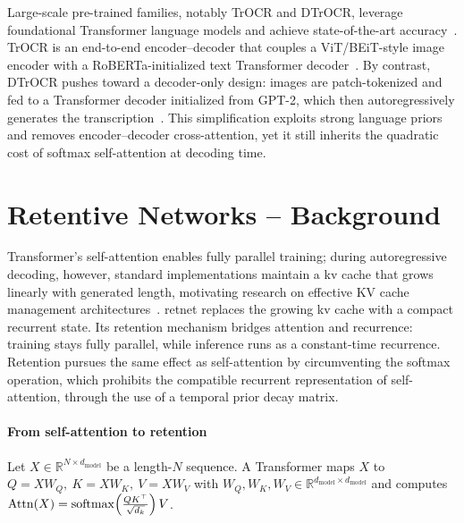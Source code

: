 \documentclass[times, review, 10pt]{elsarticle}
\begin{document}
Large-scale pre-trained families, notably TrOCR and DTrOCR, leverage foundational Transformer language models and achieve state-of-the-art accuracy~\cite{TrOCR,DTrOCR}. TrOCR is an end-to-end encoder–decoder that couples a ViT/BEiT-style image encoder with a RoBERTa-initialized text Transformer decoder~\cite{TrOCR}. By contrast, DTrOCR pushes toward a decoder-only design: images are patch-tokenized and fed to a Transformer decoder initialized from GPT-2, which then autoregressively generates the transcription~\cite{DTrOCR,gpt2}. This simplification exploits strong language priors and removes encoder–decoder cross-attention, yet it still inherits the quadratic cost of softmax self-attention at decoding time.

\section{Retentive Networks -- Background}
\label{sec:RetNet}
Transformer's self-attention enables fully parallel training; during autoregressive decoding, however, standard implementations maintain a \ac{kv} cache that grows linearly with generated length, motivating research on effective KV cache management architectures~\cite{survey_LLM_KV}. \ac{retnet} replaces the growing \ac{kv} cache with a compact recurrent state. Its retention mechanism bridges attention and recurrence: training stays fully parallel, while inference runs as a constant-time recurrence. Retention pursues the same effect as self-attention by circumventing the softmax operation, which prohibits the compatible recurrent representation of self-attention, through the use of a temporal prior decay matrix.

\paragraph{From self-attention to retention}
Let $X\in\mathbb{R}^{N\times d_{\text{model}}}$ be a length-$N$ sequence. A Transformer maps $X$ to
$Q=XW_Q,\ K=XW_K,\ V=XW_V$ with $W_Q,W_K,W_V\in\mathbb{R}^{d_{\text{model}}\times d_{\text{model}}}$ and computes
$\mathrm{Attn}(X)=\operatorname{softmax}\Bigl(\frac{QK^\top}{\sqrt{d_k}}\Bigr)\,V$.
\end{document}
